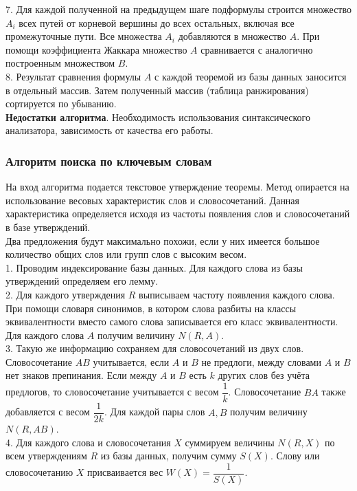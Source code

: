 \documentclass[12pt]{article}
\begin{document}
7. Для каждой полученной на предыдущем шаге подформулы строится множество $A_i$ всех путей от корневой вершины до всех остальных, включая все промежуточные пути. Все множества $A_i$ добавляются в множество $A$. При помощи коэффициента Жаккара множество $A$ сравнивается с аналогично построенным множеством $B$. \\

8. Результат сравнения формулы $A$ с каждой теоремой из базы данных заносится в отдельный массив. Затем полученный массив (таблица ранжирования) сортируется по убыванию.\\

\textbf{Недостатки алгоритма}. Необходимость использования синтаксического анализатора, зависимость от качества его работы.

\subsubsection{Алгоритм поиска по ключевым словам}  На вход алгоритма подается текстовое утверждение теоремы. Метод опирается на использование весовых характеристик слов и словосочетаний. Данная характеристика определяется исходя из частоты появления слов и словосочетаний в базе утверждений.\\

Два предложения будут максимально похожи, если у них имеется большое количество общих слов или групп слов с высоким весом.\\

1. Проводим индексирование базы данных. Для каждого слова из базы утверждений определяем его лемму. \\

2. Для каждого утверждения $R$ выписываем частоту появления каждого слова. При помощи словаря синонимов, в котором слова разбиты на классы эквивалентности вместо самого слова записывается его класс эквивалентности. Для каждого слова $A$ получим величину $N(R,A)$. \\

3. Такую же информацию сохраняем для словосочетаний из двух слов. Словосочетание $AB$ учитывается, если $A$ и $B$ не предлоги, между словами $A$ и $B$ нет знаков препинания. Если между $A$ и $B$ есть $k$ других слов без учёта предлогов, то словосочетание учитывается с весом $\dfrac{1}{k}$. Словосочетание $BA$ также добавляется с весом $\dfrac{1}{2k}$. Для каждой пары слов $A,B$ получим величину $N(R,AB)$.\\

4. Для каждого слова и словосочетания $X$ суммируем величины $N(R,X)$ по всем утверждениям $R$ из базы данных, получим сумму $S(X)$. Слову или словосочетанию $X$ присваивается вес $W(X)=\dfrac{1}{S(X)}$.\\
\end{document}
